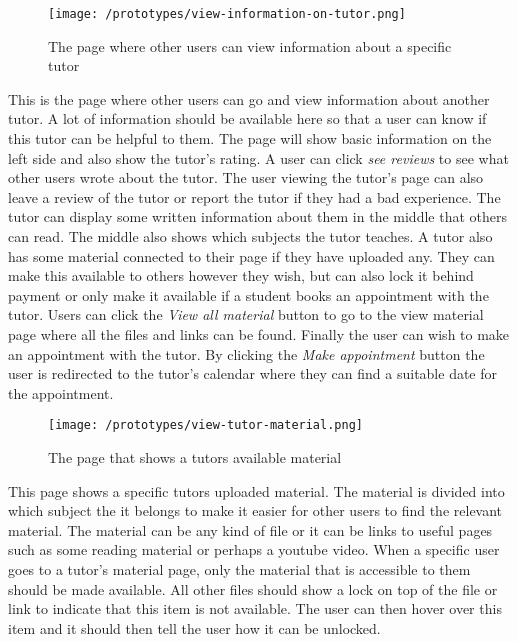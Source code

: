  \begin{figure}[H]
    \texttt{[image: /prototypes/view-information-on-tutor.png]}
     \caption{The page where other users can view information about a specific tutor}
     \label{fig:view-information-on-tutor}
 \end{figure}
This is the page where other users can go and view information about another tutor. 
A lot of information should be available here so that a user can know if this tutor can be helpful to them.
The page will show basic information on the left side and also show the tutor's rating. 
A user can click \textit{see reviews} to see what other users wrote about the tutor. 
The user viewing the tutor's page can also leave a review of the tutor or report the tutor if they had a bad experience. 
The tutor can display some written information about them in the middle that others can read. 
The middle also shows which subjects the tutor teaches. 
A tutor also has some material connected to their page if they have uploaded any. 
They can make this available to others however they wish, but can also lock it behind payment or only make it available if a student books an appointment with the tutor.
Users can click the \textit{View all material} button to go to the view material page where all the files and links can be found. 
Finally the user can wish to make an appointment with the tutor. 
By clicking the \textit{Make appointment} button the user is redirected to the tutor's calendar where they can find a suitable date for the appointment. 


 \begin{figure}[H]
    \texttt{[image: /prototypes/view-tutor-material.png]}
     \caption{The page that shows a tutors available material}
     \label{fig:view-tutor-material}
 \end{figure}
This page shows a specific tutors uploaded material. 
The material is divided into which subject the it belongs to make it easier for other users to find the relevant material. 
The material can be any kind of file or it can be links to useful pages such as some reading material or perhaps a youtube video. 
When a specific user goes to a tutor's material page, only the material that is accessible to them should be made available. 
All other files should show a lock on top of the file or link to indicate that this item is not available. 
The user can then hover over this item and it should then tell the user how it can be unlocked. 
